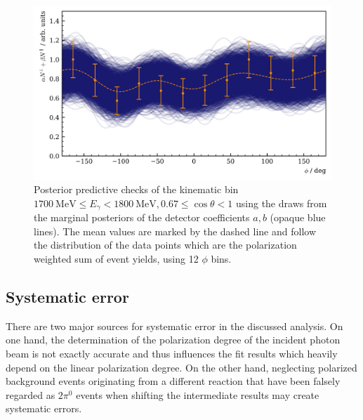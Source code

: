 \begin{figure}[htbp]
	\centering
	\includegraphics[width=\linewidth]{../bayes/etap_event_based_fit/plots/eff_PPC.png}
	\caption{Posterior predictive checks of the kinematic bin $\SI{1700}{\mega\eV}\leq E_\gamma<\SI{1800}{\mega\eV}, 0.67\leq\cos\theta<1$ using the draws from the marginal posteriors of the detector coefficients $a,b$ (opaque blue lines). The mean values are marked by the dashed line and follow the distribution of the data points which are the polarization weighted sum of event yields, using 12 $\phi$ bins.}	
	\label{fig:etap_eff}
\end{figure}
\subsection{Systematic error}
\label{subsec:sys}
There are two major sources for systematic error in the discussed analysis. On one hand, the determination of the polarization degree of the incident photon beam is not exactly accurate and thus influences the fit results which heavily depend on the linear polarization degree. On the other hand, neglecting polarized background events originating from a different reaction that have been falsely regarded as $2\pi^0$ events when shifting the intermediate results may create systematic errors. 


